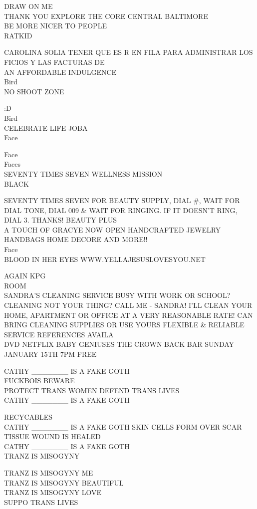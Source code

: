 \documentclass[10pt,letterpaper]{article}
\begin{document}
DRAW ON ME\\
THANK YOU EXPLORE THE CORE CENTRAL BALTIMORE\\
BE MORE NICER TO PEOPLE\\
RATKID

CAROLINA SOLIA TENER QUE ES R EN FILA PARA ADMINISTRAR LOS FICIOS Y LAS FACTURAS DE\\
AN AFFORDABLE INDULGENCE\\
Bird\\
NO SHOOT ZONE

:D\\
Bird\\
CELEBRATE LIFE JOBA\\
Face

Face\\
Faces\\
SEVENTY TIMES SEVEN WELLNESS MISSION\\
BLACK

SEVENTY TIMES SEVEN FOR BEAUTY SUPPLY, DIAL \#, WAIT FOR DIAL TONE, DIAL 009 \& WAIT FOR RINGING.  IF IT DOESN'T RING, DIAL 3.  THANKS!  BEAUTY PLUS\\
A TOUCH OF GRACYE NOW OPEN HANDCRAFTED JEWELRY HANDBAGS HOME DECORE AND MORE!!\\
Face\\
BLOOD IN HER EYES WWW.YELLAJESUSLOVESYOU.NET

AGAIN KPG\\
ROOM\\
SANDRA'S CLEANING SERVICE BUSY WITH WORK OR SCHOOL?  CLEANING NOT YOUR THING?  CALL ME {-} SANDRA!   I'LL CLEAN YOUR HOME, APARTMENT OR OFFICE AT A VERY REASONABLE RATE!  CAN BRING CLEANING SUPPLIES OR USE YOURS FLEXIBLE \& RELIABLE SERVICE REFERENCES AVAILA\\
DVD NETFLIX BABY GENIUSES THE CROWN BACK BAR SUNDAY JANUARY 15TH 7PM FREE

CATHY \_\_\_\_\_\_\_ IS A FAKE GOTH\\
FUCKBOIS BEWARE\\
PROTECT TRANS WOMEN DEFEND TRANS LIVES\\
CATHY \_\_\_\_\_\_\_ IS A FAKE GOTH

RECYCABLES\\
CATHY \_\_\_\_\_\_\_ IS A FAKE GOTH SKIN CELLS FORM OVER SCAR TISSUE WOUND IS HEALED\\
CATHY \_\_\_\_\_\_\_ IS A FAKE GOTH\\
TRANZ IS MISOGYNY

TRANZ IS MISOGYNY ME\\
TRANZ IS MISOGYNY BEAUTIFUL\\
TRANZ IS MISOGYNY LOVE\\
SUPPO TRANS LIVES
\end{document}
